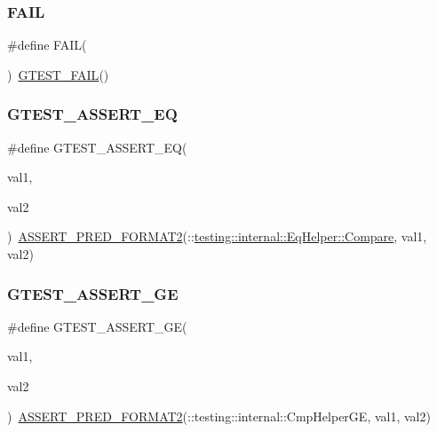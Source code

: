 \subsubsection{\texorpdfstring{FAIL}{FAIL}}
{\footnotesize\ttfamily \#define F\+A\+IL(\begin{DoxyParamCaption}{ }\end{DoxyParamCaption})~\mbox{\hyperlink{_obj__test_2lib_2googletest-release-1_88_81_2googletest_2include_2gtest_2gtest_8h_a636231436707c30d6778f79ae96f5dc6}{G\+T\+E\+S\+T\+\_\+\+F\+A\+IL}}()}

\mbox{\label{googletest-master_2googletest_2include_2gtest_2gtest_8h_a8a7a47387090810cdfe78933d348182d}} 
\subsubsection{\texorpdfstring{GTEST\_ASSERT\_EQ}{GTEST\_ASSERT\_EQ}}
{\footnotesize\ttfamily \#define G\+T\+E\+S\+T\+\_\+\+A\+S\+S\+E\+R\+T\+\_\+\+EQ(\begin{DoxyParamCaption}\item[{}]{val1,  }\item[{}]{val2 }\end{DoxyParamCaption})~\mbox{\hyperlink{_obj__test_2lib_2googletest-release-1_88_81_2googletest_2include_2gtest_2gtest__pred__impl_8h_ac452685a1a98ea3d96eb956a062ee210}{A\+S\+S\+E\+R\+T\+\_\+\+P\+R\+E\+D\+\_\+\+F\+O\+R\+M\+A\+T2}}(\+::\mbox{\hyperlink{classtesting_1_1internal_1_1_eq_helper_a14dd80457029c1ab4a4d04f20003d237}{testing\+::internal\+::\+Eq\+Helper\+::\+Compare}}, val1, val2)}

\mbox{\label{googletest-master_2googletest_2include_2gtest_2gtest_8h_a55373d99c079ff1b894e2eb5bcd15c5a}} 
\subsubsection{\texorpdfstring{GTEST\_ASSERT\_GE}{GTEST\_ASSERT\_GE}}
{\footnotesize\ttfamily \#define G\+T\+E\+S\+T\+\_\+\+A\+S\+S\+E\+R\+T\+\_\+\+GE(\begin{DoxyParamCaption}\item[{}]{val1,  }\item[{}]{val2 }\end{DoxyParamCaption})~\mbox{\hyperlink{_obj__test_2lib_2googletest-release-1_88_81_2googletest_2include_2gtest_2gtest__pred__impl_8h_ac452685a1a98ea3d96eb956a062ee210}{A\+S\+S\+E\+R\+T\+\_\+\+P\+R\+E\+D\+\_\+\+F\+O\+R\+M\+A\+T2}}(\+::testing\+::internal\+::\+Cmp\+Helper\+GE, val1, val2)}

